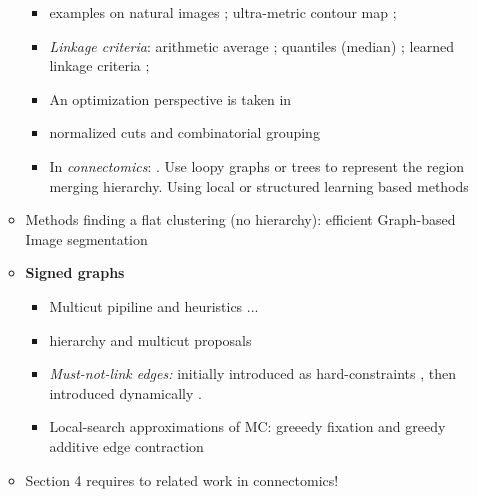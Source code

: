 \begin{itemize}
\begin{itemize}
\begin{itemize}
\item examples on natural images \cite{ren2013image,liu2016image}; ultra-metric contour map \cite{arbelaez2011contour};
\item \emph{Linkage criteria}: arithmetic average \cite{liu2018affinity,lee2017superhuman}; 
quantiles (median) \cite{funke2018large}; %
   learned linkage criteria \cite{nunez2013machine}; 
\item An optimization perspective is taken in \cite{kiran2014global} %
\item normalized cuts and combinatorial grouping \cite{arbelaez2014multiscale}
\item In \emph{connectomics}: \cite{liu2016sshmt}. Use loopy graphs \cite{kaynig2015large,krasowski2015improving} or trees \cite{liu2016sshmt,liu2014modular,funke2015learning,uzunbas2016efficient} to represent the region merging hierarchy. Using local \cite{liu2014modular,krasowski2015improving} or structured \cite{funke2015learning,uzunbas2016efficient} learning based methods %
\end{itemize}
\item Methods finding a flat clustering (no hierarchy): efficient Graph-based Image segmentation \cite{felzenszwalb2004efficient} %
\item \textbf{Signed graphs} 
\begin{itemize}
    \item Multicut pipiline and heuristics \cite{beier2017multicut}... 

\item hierarchy and multicut proposals \cite{funke2018candidate}
\item \textit{Must-not-link edges:} initially introduced as hard-constraints \cite{malmberg2011generalized}, then introduced dynamically \cite{wolf2018mutex,levinkov2017comparative}. 
\item Local-search approximations of MC: greeedy fixation and greedy additive edge contraction \cite{levinkov2017comparative}
\end{itemize}
\item Section 4 requires to related work in connectomics!
\end{itemize}

\end{itemize}

